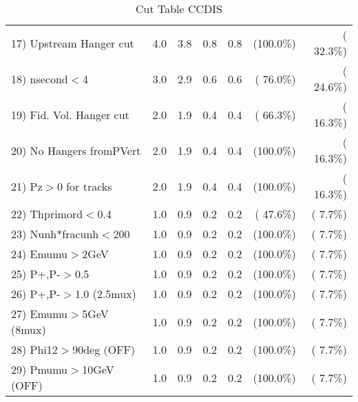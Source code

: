 \begin{table}[h!]
\begin{tabular}{||l||r|r|r|r|r|r||}
 17) Upstream Hanger cut  &          4.0 &          3.8 &          0.8 &          0.8 & (100.0\%) & ( 32.3\%) \\
 18) nsecond$<$4          &          3.0 &          2.9 &          0.6 &          0.6 & ( 76.0\%) & ( 24.6\%) \\
 19) Fid. Vol. Hanger cut &          2.0 &          1.9 &          0.4 &          0.4 & ( 66.3\%) & ( 16.3\%) \\
 20) No Hangers fromPVert &          2.0 &          1.9 &          0.4 &          0.4 & (100.0\%) & ( 16.3\%) \\
 21) Pz$>$0 for tracks    &          2.0 &          1.9 &          0.4 &          0.4 & (100.0\%) & ( 16.3\%) \\
 22) Thprimord$<$0.4      &          1.0 &          0.9 &          0.2 &          0.2 & ( 47.6\%) & (  7.7\%) \\
 23) Nunh*fracunh$<$200   &          1.0 &          0.9 &          0.2 &          0.2 & (100.0\%) & (  7.7\%) \\
 24) Emumu$>$2GeV         &          1.0 &          0.9 &          0.2 &          0.2 & (100.0\%) & (  7.7\%) \\
 25) P+,P-$>$0.5          &          1.0 &          0.9 &          0.2 &          0.2 & (100.0\%) & (  7.7\%) \\
 26) P+,P-$>$1.0 (2.5mux) &          1.0 &          0.9 &          0.2 &          0.2 & (100.0\%) & (  7.7\%) \\
 27) Emumu$>$5GeV  (8mux) &          1.0 &          0.9 &          0.2 &          0.2 & (100.0\%) & (  7.7\%) \\
 28) Phi12$>$90deg  (OFF) &          1.0 &          0.9 &          0.2 &          0.2 & (100.0\%) & (  7.7\%) \\
 29) Pmumu$>$10GeV  (OFF) &          1.0 &          0.9 &          0.2 &          0.2 & (100.0\%) & (  7.7\%) \\
 \hline
 \hline
 \end{tabular}
 \caption{Cut Table  CCDIS    }
 \label{tab-cutcohjpsi-mumu_ncdis}
 \end{table}
